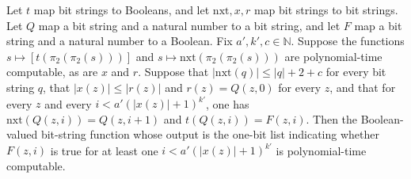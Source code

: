 \begin{theorem}
\label{Complexity.BlockLoop.polyTimeComputable_orLoop}
\leanok
{}
Let $t$ map bit strings to Booleans, and let $\mathrm{nxt},x,r$ map bit strings to bit
strings. Let $Q$ map a bit string and a natural number to a bit string, and let $F$ map
a bit string and a natural number to a Boolean. Fix $a',k',c\in\mathbb{N}$. Suppose the
functions $s\mapsto[t(\pi_2(\pi_2(s)))]$ and $s\mapsto\mathrm{nxt}(\pi_2(\pi_2(s)))$ are
polynomial-time computable, as are $x$ and $r$. Suppose that $|\mathrm{nxt}(q)|\le
|q|+2+c$ for every bit string $q$, that $|x(z)|\le |r(z)|$ and $r(z)=Q(z,0)$ for every
$z$, and that for every $z$ and every $i<a'(|x(z)|+1)^{k'}$, one has
$\mathrm{nxt}(Q(z,i))=Q(z,i+1)$ and $t(Q(z,i))=F(z,i)$. Then the Boolean-valued
bit-string function whose output is the one-bit list indicating whether $F(z,i)$ is true
for at least one $i<a'(|x(z)|+1)^{k'}$ is polynomial-time computable.
\end{theorem}

